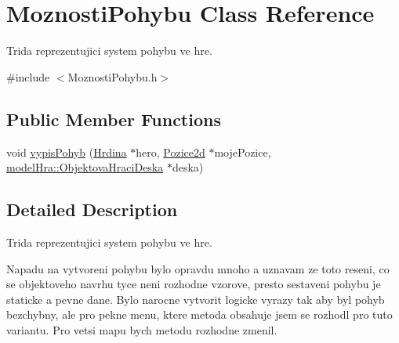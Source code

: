 \hypertarget{class_moznosti_pohybu}{\section{Moznosti\-Pohybu Class Reference}
\label{class_moznosti_pohybu}
}


Trida reprezentujici system pohybu ve hre.  




{\ttfamily \#include $<$Moznosti\-Pohybu.\-h$>$}

\subsection*{Public Member Functions}
\begin{DoxyCompactItemize}
\item 
void \hyperlink{class_moznosti_pohybu_a134cc45c1fb6e479f0e2f37ef3d8e4d8}{vypis\-Pohyb} (\hyperlink{class_hrdina}{Hrdina} $\ast$hero, \hyperlink{struct_pozice2d}{Pozice2d} $\ast$moje\-Pozice, \hyperlink{classmodel_hra_1_1_objektova_hraci_deska}{model\-Hra\-::\-Objektova\-Hraci\-Deska} $\ast$deska)
\end{DoxyCompactItemize}


\subsection{Detailed Description}
Trida reprezentujici system pohybu ve hre. 

Napadu na vytvoreni pohybu bylo opravdu mnoho a uznavam ze toto reseni, co se objektoveho navrhu tyce neni rozhodne vzorove, presto sestaveni pohybu je staticke a pevne dane. Bylo narocne vytvorit logicke vyrazy tak aby byl pohyb bezchybny, ale pro pekne menu, ktere metoda obsahuje jsem se rozhodl pro tuto variantu. Pro vetsi mapu bych metodu rozhodne zmenil. 

